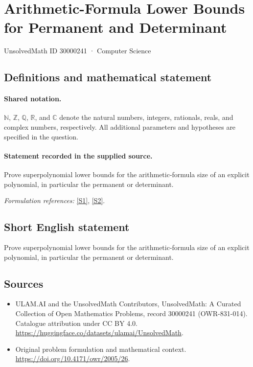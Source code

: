\documentclass[11pt]{article}
\newcommand{\sref}[2]{\hyperlink{source:#1:#2}{[S#2]}}
\begin{document}
\setcounter{section}{30000240}
\section{Arithmetic-Formula Lower Bounds for Permanent and Determinant}\label{30000241}
{\small UnsolvedMath ID 30000241 · Computer Science}
\subsection{Definitions and mathematical statement}

\paragraph{Shared notation.}$\mathbb N$, $\mathbb Z$, $\mathbb Q$, $\mathbb R$, and $\mathbb C$ denote the natural numbers, integers, rationals, reals, and complex numbers, respectively. All additional parameters and hypotheses are specified in the question.


\paragraph{Statement recorded in the supplied source.}
Prove superpolynomial lower bounds for the arithmetic-formula size of an explicit polynomial, in particular the permanent or determinant.
\par\smallskip\textit{Formulation references:} \sref{30000241}{1}, \sref{30000241}{2}.
\subsection{Short English statement}
Prove superpolynomial lower bounds for the arithmetic-formula size of an explicit polynomial, in particular the permanent or determinant.
\subsection{Sources}
\begin{itemize}
\item[\hypertarget{source:30000241:1}{S1}] ULAM.AI and the UnsolvedMath Contributors, UnsolvedMath: A Curated Collection of Open Mathematics Problems, record 30000241 (OWR-831-014). Catalogue attribution under CC BY 4.0.
\url{https://huggingface.co/datasets/ulamai/UnsolvedMath}.
\item[\hypertarget{source:30000241:2}{S2}] Original problem formulation and mathematical context.
\url{https://doi.org/10.4171/owr/2005/26}.
\end{itemize}
\label{end:30000241}
\end{document}
